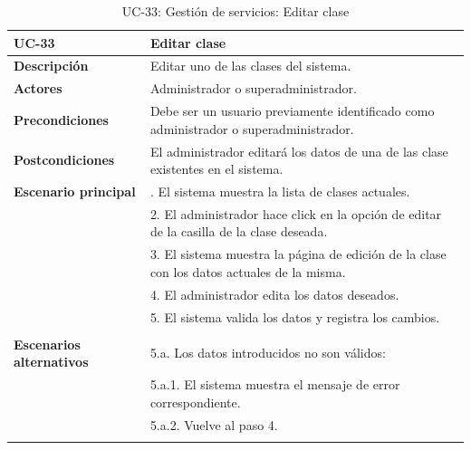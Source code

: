 \begin{table}
  \begin{center}
    \begin{tabularx}{16.4cm}{|l|X|}
      \hline
      \textbf{UC-33} & \textbf{Editar clase}\\
      \hline
      \textbf{Descripción} & Editar uno de las clases del sistema.\\
      \hline
      \textbf{Actores} & Administrador o superadministrador.\\
      \hline
      \textbf{Precondiciones} & Debe ser un usuario previamente identificado como administrador o superadministrador.\\
      \hline
      \textbf{Postcondiciones} & El administrador editará los datos de una de las clase existentes en el sistema.\\
      \hline
      \textbf{Escenario principal} & \smallskip 1. El sistema muestra la lista de clases actuales.\\
      & 2. El administrador hace click en la opción de editar de la casilla de la clase deseada.\\
      & 3. El sistema muestra la página de edición de la clase con los datos actuales de la misma.\\
      & 4. El administrador edita los datos deseados.\\
      & 5. El sistema valida los datos y registra los cambios.\\
      & \\
      \hline
      \textbf{Escenarios alternativos} & \smallskip 5.a. Los datos introducidos no son válidos:\\
      & \hspace{0.3cm} 5.a.1. El sistema muestra el mensaje de error correspondiente.\\
      & \hspace{0.3cm} 5.a.2. Vuelve al paso 4.\\
      & \\
      \hline
    \end{tabularx}
    \caption{UC-33: Gestión de servicios: Editar clase}
    \label{tab:CU-editar-clase}
  \end{center}
\end{table}



